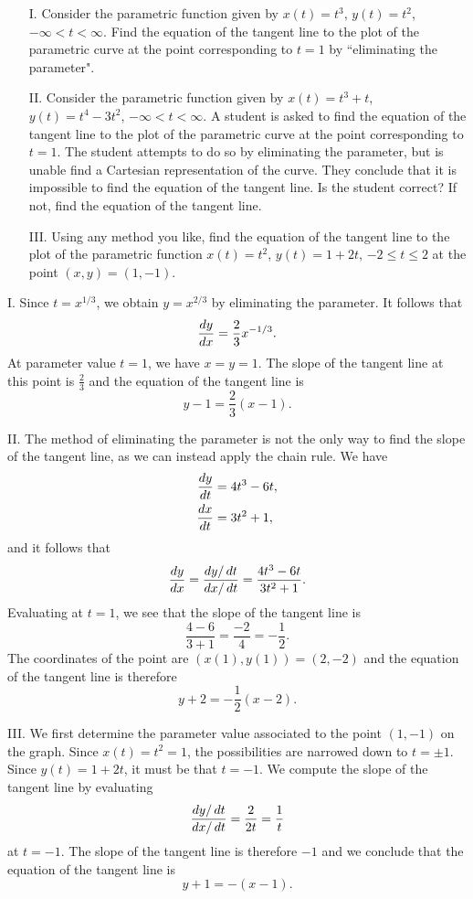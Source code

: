 \documentclass[noauthor,handout]{ximera}
\begin{document}
\begin{problem}
\begin{itemize}
\item[I.] Consider the parametric function given by $x(t)=t^3$, $y(t)=t^2$, $-\infty <  t < \infty$. Find the equation of the tangent line to the plot of the parametric curve at the point corresponding to $t=1$ by ``eliminating the parameter". 

\item[II.] Consider the parametric function given by $x(t)=t^3+t$, $y(t)=t^4-3t^2$, $-\infty <  t < \infty$. A student is asked to find the equation of the tangent line to the plot of the parametric curve at the point corresponding to $t=1$. The student attempts to do so by eliminating the parameter, but is unable find a Cartesian representation of the curve. They conclude that it is impossible to find the equation of the tangent line. Is the student correct? If not, find the equation of the tangent line.

\item[III.] Using any method you like, find the equation of the tangent line to the plot of the parametric function $x(t)=t^2$, $y(t)=1+2t$, $-2 \leq t \leq 2$ at the point $(x,y)=(1,-1)$. 
\end{itemize}

\begin{freeResponse}
I. Since $t = x^{1/3}$, we obtain $y=x^{2/3}$ by eliminating the parameter. It follows that
$$
\frac{\mathop{}\!d y}{\mathop{}\!d x} = \frac{2}{3} x^{-1/3}.
$$
At parameter value $t=1$, we have $x = y = 1$. The slope of the tangent line at this point is $\frac{2}{3}$ and the equation of the tangent line is 
$$
y - 1 = \frac{2}{3}(x-1).
$$

II. The method of eliminating the parameter is not the only way to find the slope of the tangent line, as we can instead apply the chain rule. We have
\begin{align*}
\frac{\mathop{}\!d y}{\mathop{}\!d t} &= 4t^3 - 6t, \\
\frac{\mathop{}\!d x}{\mathop{}\!d t} &= 3 t^2 + 1,
\end{align*}
and it follows that 
$$
\frac{\mathop{}\!d y}{\mathop{}\!d x} = \frac{\mathop{}\!d y/ \mathop{}\!d t}{\mathop{}\!d x/ \mathop{}\!d t} = \frac{4t^3 - 6t}{3t^2 + 1}.
$$
Evaluating at $t = 1$, we see that the slope of the tangent line is 
$$
\frac{4 - 6}{3 + 1} = \frac{-2}{4} = - \frac{1}{2}.
$$
The coordinates of the point are $(x(1),y(1)) = (2,-2)$ and the equation of the tangent line is therefore
$$
y+2 = -\frac{1}{2} (x - 2).
$$

III. We first determine the parameter value associated to the point $(1,-1)$ on the graph. Since $x(t) = t^2 = 1$, the possibilities are narrowed down to $t = \pm 1$. Since $y(t) = 1+2t$, it must be that $t=-1$. We compute the slope of the tangent line by evaluating 
$$
\frac{\mathop{}\!d y/ \mathop{}\!d t}{\mathop{}\!d x / \mathop{}\!d t} = \frac{2}{2t} = \frac{1}{t}
$$
at $t = -1$. The slope of the tangent line is therefore $-1$ and we conclude that the equation of the tangent line is
$$
y + 1 = -(x-1).
$$
\end{freeResponse}
\end{problem}
\end{document}
